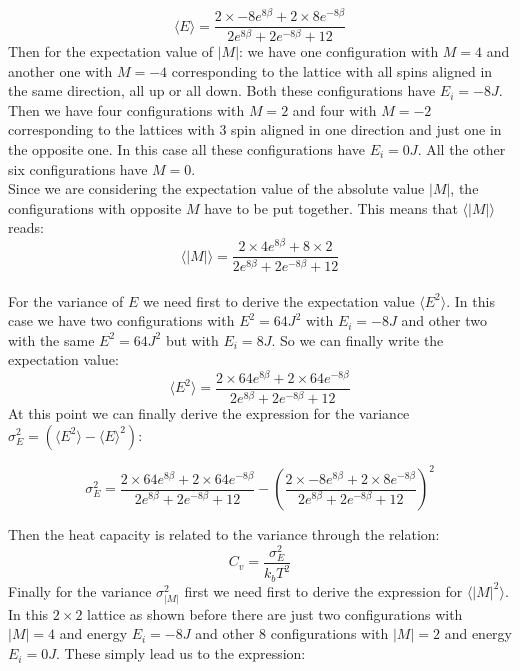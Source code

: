 \documentclass[10pt,a4paper,titlepage]{article}
\begin{document}
\begin{equation}
\langle E \rangle=\frac{2 \times -8 e^{8 \beta}+2 \times 8 e^{-8 \beta} }{2 e^{ 8 \beta }+2e^{- 8 \beta }+12}
\end{equation}
Then for the expectation value of $|M|$:  we have one configuration with $M=4$ and another one with $M=-4$ corresponding to the lattice with all spins aligned in the same direction, all up or all down. Both these configurations have $E_i=-8J$. Then we have four configurations with $M=2$ and four with $M=-2$ corresponding to the lattices with $3$ spin aligned in one direction and just one in the opposite one. In this case all these configurations have $E_i=0J$. All the other six configurations have $M=0$.
\\
Since we are considering the expectation value of the absolute value $|M|$, the configurations with opposite  $M$ have to be put together. This means that $\langle |M| \rangle$ reads: 
\begin{equation}
\langle |M| \rangle=\frac{2 \times 4 e^{8 \beta}+8 \times 2}{2 e^{ 8 \beta }+2e^{- 8 \beta }+12}
\end{equation}
\\
For the variance of $E$ we need first to derive the expectation value $\langle E^2 \rangle$. In this case we have two configurations with $E^2=64 J^2$ with $E_i=-8J$ and other two with the same $E^2=64J^2$ but with $E_i=8 J$. So we can finally write the expectation value: 
\begin{equation}
\langle E^2 \rangle = \frac{2 \times 64 e^{8 \beta}+2 \times 64 e ^{-8 \beta}}{2 e^{ 8 \beta }+2e^{- 8 \beta }+12}
\end{equation}
At this point we can finally derive the expression for the variance $\sigma^2_E=(\langle E^2\rangle-\langle E \rangle ^2)$:
\begin{center}
\begin{equation}\sigma^2_E=\frac{2 \times 64 e^{8 \beta}+2 \times 64 e ^{-8 \beta}}{2 e^{ 8 \beta }+2e^{- 8 \beta }+12}-\left(\frac{2 \times -8 e^{8 \beta}+2 \times 8 e^{-8 \beta} }{2 e^{ 8 \beta }+2e^{- 8 \beta }+12}\right)^2
\end{equation}
\end{center}
Then the heat capacity is related to the variance through the relation: $$C_v=\frac{\sigma^2_E}{k_b T^2}$$
\newpage
\noindent Finally for the variance $\sigma^2_{|M|}$ first we need  first to derive the expression for $\langle |M|^2 \rangle$. In this $2 \times 2$ lattice as shown before there are just two configurations with $|M|=4$ and energy $E_i=-8J$ and other $8$ configurations with $|M|=2$ and energy $E_i=0J$. These simply lead us to the expression: 
\end{document}
